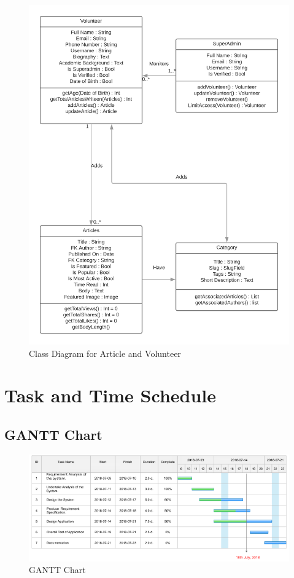 \documentclass[12pt, a4paper, titlepage]{article}
\begin{document}
\begin{center}
\begin{figure}[ht]
\includegraphics[scale=0.5]{Class_Diagram_for_Election_Portal_2.png}
	\caption{Class Diagram for Article and Volunteer}
\end{figure}
\end{center}
\newpage

\section{Task and Time Schedule}
\subsection{GANTT Chart }
\begin{center}
\begin{figure}[ht]
\includegraphics[scale=0.5]{gantt.png}
	\caption{GANTT Chart}
\end{figure}
\end{center}
\end{document}
